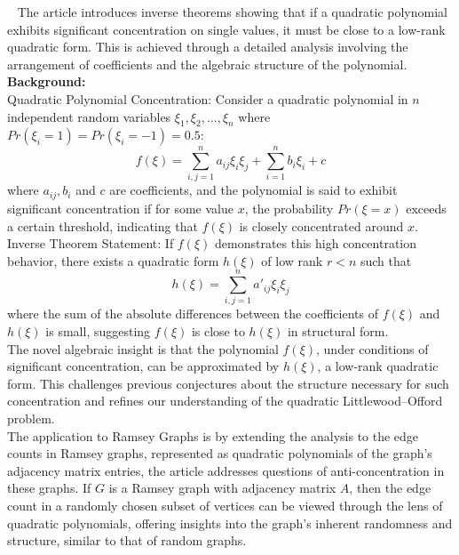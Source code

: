 

~\cite{kwan2019algebraic}
The article introduces inverse theorems showing that if a quadratic polynomial exhibits significant concentration on single values, it must be close to a low-rank quadratic form. This is achieved through a detailed analysis involving the arrangement of coefficients and the algebraic structure of the polynomial.\\\newline
\textbf{Background:}\\
Quadratic Polynomial Concentration: Consider a quadratic polynomial in ${n}$ independent random variables ${\xi_1, \xi_2,...,\xi_n}$ where\\${Pr(\xi_i=1)=Pr(\xi_i=-1)=0.5}$:
$${f(\xi)=\sum_{i,j=1}^{n} a_{ij} \xi_i \xi_j + \sum_{i=1}^{n} b_i \xi_i + c}$$
where ${a_{ij},b_i}$ and ${c}$ are coefficients, and the polynomial is said to exhibit significant concentration if for some value ${x}$, the probability ${Pr(\xi=x)}$ exceeds a certain threshold, indicating that ${f(\xi)}$ is closely concentrated around ${x}$.\\\newline
Inverse Theorem Statement: If ${f(\xi)}$ demonstrates this high concentration behavior, there exists a quadratic form ${h(\xi)}$ of low rank ${r < n}$ such that
$${h(\xi) = \sum_{i,j=1}^{n} a'_{ij} \xi_i \xi_j
}$$
where the sum of the absolute differences between the coefficients of ${f(\xi)}$ and ${h(\xi)}$ is small, suggesting ${f(\xi)}$ is close to ${h(\xi)}$ in structural form.
\\\newline
The novel algebraic insight is that the polynomial ${f(\xi)}$, under conditions of significant concentration, can be approximated by ${h(\xi)}$, a low-rank quadratic form. This challenges previous conjectures about the structure necessary for such concentration and refines our understanding of the quadratic Littlewood–Offord problem.\\\newline
The application to Ramsey Graphs is by extending the analysis to the edge counts in Ramsey graphs, represented as quadratic polynomials of the graph's adjacency matrix entries, the article addresses questions of anti-concentration in these graphs. If ${G}$ is a Ramsey graph with adjacency matrix 
${A}$, then the edge count in a randomly chosen subset of vertices can be viewed through the lens of quadratic polynomials, offering insights into the graph's inherent randomness and structure, similar to that of random graphs.\\\newline
